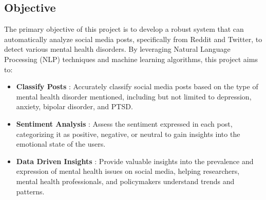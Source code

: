 \subsection{Objective}
\noindent
The primary objective of this project is to develop a robust system that can automatically analyze social media posts, specifically from Reddit and Twitter, to detect various mental health disorders. By leveraging Natural Language Processing (NLP) techniques and machine learning algorithms, this project aims to:
\begin{itemize}
    \item \textbf{Classify Posts} :
    \noindent
    Accurately classify social media posts based on the type of mental health disorder mentioned, including but not limited to depression, anxiety, bipolar disorder, and PTSD.

    \item \textbf{Sentiment Analysis} :
    \noindent
    Assess the sentiment expressed in each post, categorizing it as positive, negative, or neutral to gain insights into the emotional state of the users.

    \item \textbf{Data Driven Insights} :
    \noindent
    Provide valuable insights into the prevalence and expression of mental health issues on social media, helping researchers, mental health professionals, and policymakers understand trends and patterns.
\end{itemize}

